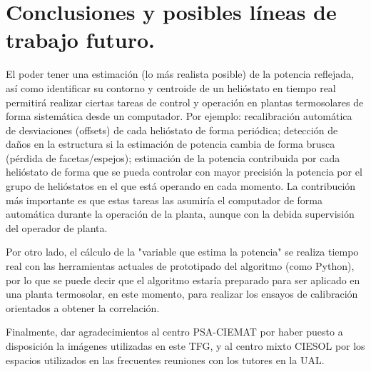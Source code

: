 \chapter{Conclusiones y posibles líneas de trabajo futuro.}
 
El poder tener una estimación (lo más realista posible) de la potencia reflejada, así como identificar su contorno y centroide de un helióstato en tiempo real permitirá realizar ciertas tareas de control y operación en plantas termosolares de forma sistemática desde un computador. Por ejemplo: recalibración automática de desviaciones (offsets) de cada helióstato de forma periódica; detección de daños en la estructura si la estimación de potencia cambia de forma brusca (pérdida de facetas/espejos); estimación de la potencia contribuida por cada helióstato de forma que se pueda controlar con mayor precisión la potencia por el grupo de helióstatos en el que está operando en cada momento. La contribución más importante es que estas tareas las asumiría el computador de forma automática durante la operación de la planta, aunque con la debida supervisión del operador de planta.

Por otro lado, el cálculo de la "variable que estima la potencia" se realiza tiempo real con las herramientas actuales de prototipado del algoritmo (como Python), por lo que se puede decir que el algoritmo estaría preparado para ser aplicado en una planta termosolar, en este momento, para realizar los ensayos de calibración orientados a obtener la correlación.

Finalmente, dar agradecimientos al centro PSA-CIEMAT por haber puesto a disposición la imágenes utilizadas en este TFG, y al centro mixto CIESOL por los espacios utilizados en las frecuentes reuniones con los tutores en la UAL.